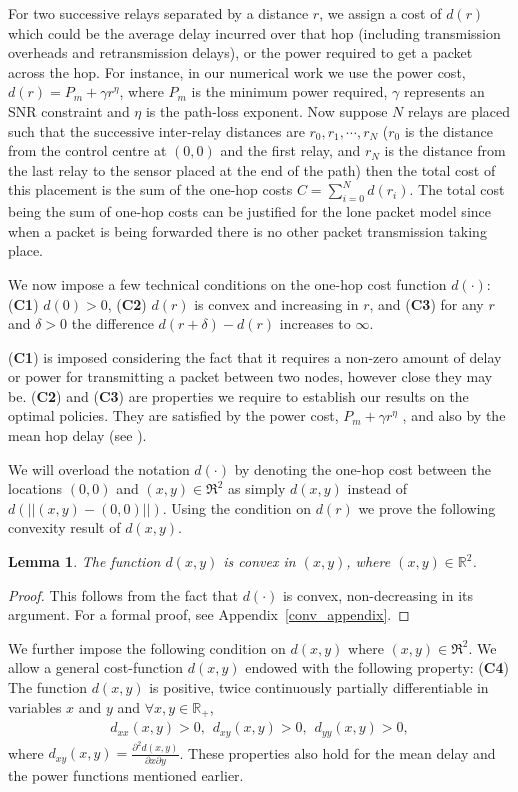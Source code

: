 \documentclass[conference]{IEEEtran}
\newtheorem{lemma}{Lemma}
\begin{document}
For two successive relays separated by a distance $r$, we assign a cost of $d(r)$ 
which could be the average delay incurred over that hop (including transmission overheads and 
retransmission delays), or the power required to get a packet across the hop.
For instance, in our numerical work we use the power cost, 
$d(r)=P_m+\gamma r^\eta$, where $P_m$ is the minimum power required, $\gamma$ 
represents an SNR constraint and $\eta$ is the path-loss exponent. Now suppose 
$N$ relays are placed such that the successive 
inter-relay distances are $r_0,r_1,\cdots,r_N$ ($r_0$ is the distance from the 
control centre at $(0,0)$ and the first relay, and $r_N$ is the distance from 
the last relay to the sensor placed at the end of the path) then the total cost 
of this placement is the sum of the one-hop costs $C=\sum_{i=0}^N d(r_i)$.
The total cost being the sum of one-hop costs can be justified for the lone packet 
model since when a packet is being forwarded there is no other packet
transmission taking place. 

We now impose a few technical conditions on the one-hop cost function
$d(\cdot)$: (\textbf{C1}) $d(0)>0$, (\textbf{C2}) $d(r)$ is convex and
increasing in $r$, and (\textbf{C3}) for any $r$ and $\delta>0$ the
difference $d(r+\delta)-d(r)$ increases to $\infty$.

(\textbf{C1}) is imposed considering the fact that it requires a
non-zero amount of delay or power for transmitting a packet between
two nodes, however close they may be. (\textbf{C2}) and (\textbf{C3})
are properties we require to establish our results on the optimal
policies. They are satisfied by the power cost, $P_m+\gamma r^\eta$ ,
and also by the mean hop delay (see \cite{Prasenjit}).

We will overload the notation $d(\cdot)$ by denoting the one-hop cost between 
the locations $(0,0)$ and $(x,y)\in\Re^2$ as simply $d(x,y)$ instead 
of $d(||(x,y)-(0,0)||)$. Using the condition on $d(r)$ we prove the following 
convexity result of $d(x,y)$.
\begin{lemma} \label{conv} The function $d(x,y)$ is convex in $(x,y)$,
  where $(x,y)\in\mathbb{R}^2$.
\end{lemma}
\begin{proof}
  This follows from the fact that $d(\cdot)$ is convex, non-decreasing
  in its argument. For a formal proof, see
  Appendix~\ref{conv_appendix}.
\end{proof}
We further impose the following condition on $d(x,y)$ where
$(x,y)\in\Re^2$.  We allow a general cost-function $d(x,y)$ endowed
with the following property: (\textbf{C4}) The function $d(x,y)$ is
positive, twice continuously partially differentiable in variables $x$
and $y$ and $\forall x,y\in\mathbb{R}_+$,
\begin{eqnarray} \label{assumption}
d_{xx}(x,y)>0,\hspace{5pt}d_{xy}(x,y)>0,\hspace{5pt}d_{yy}(x,y)>0,
\end{eqnarray}
where $d_{xy}(x,y)=\frac{\partial^2d(x,y)}{\partial x \partial
  y}$. These properties also hold for the mean delay and the power
functions mentioned earlier.
\end{document}
